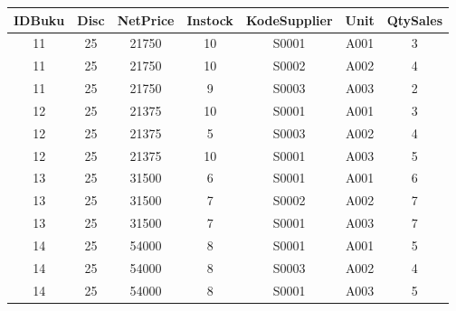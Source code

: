 \documentclass[12pt,a4paper]{article}
\begin{document}
\begin{enumerate}
\begin{enumerate}
\begin{multicols}{3}
            \begin{center}
              \begin{adjustbox}{scale=0.5,center}
                \begin{tabular}{ |c|c|c|c|c|c|c| } \hline
                  IDBuku &  Disc & NetPrice & Instock & KodeSupplier & Unit & QtySales \\ \hline
                  11     &  25   & 21750    & 10      & S0001        & A001 & 3        \\ \hline
                  11     &  25   & 21750    & 10      & S0002        & A002 & 4        \\ \hline
                  11     &  25   & 21750    & 9       & S0003        & A003 & 2        \\ \hline
                  12     &  25   & 21375    & 10      & S0001        & A001 & 3        \\ \hline
                  12     &  25   & 21375    & 5       & S0003        & A002 & 4        \\ \hline
                  12     &  25   & 21375    & 10      & S0001        & A003 & 5        \\ \hline
                  13     &  25   & 31500    & 6       & S0001        & A001 & 6        \\ \hline
                  13     &  25   & 31500    & 7       & S0002        & A002 & 7        \\ \hline
                  13     &  25   & 31500    & 7       & S0001        & A003 & 7        \\ \hline
                  14     &  25   & 54000    & 8       & S0001        & A001 & 5        \\ \hline
                  14     &  25   & 54000    & 8       & S0003        & A002 & 4        \\ \hline
                  14     &  25   & 54000    & 8       & S0001        & A003 & 5        \\ \hline
                \end{tabular}
              \end{adjustbox}
            \end{center}

            \end{multicols}

        \end{enumerate}


\end{enumerate}
\end{document}
